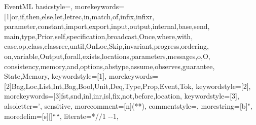 

\RequirePackage{listings}
\RequirePackage{color}


\lstdefinelanguage
    {EventML}
    {
      basicstyle=\sffamily,
      morekeywords=[1]{or,if,then,else,let,letrec,in,match,of,infix,infixr,%
        parameter,constant,import,export,input,output,internal,base,send,%
        main,type,Prior,self,specification,broadcast,Once,where,with,%
        case,op,class,classrec,until,OnLoc,Skip,invariant,progress,ordering,%
        on,variable,Output,forall,exists,locations,parameters,messages,o,O,%
        consistency,memory,and,options,abstype,assume,observes,guarantee,%
        State,Memory},
      keywordstyle=[1]\color{EMLpurple},
      morekeywords=[2]{Bag,Loc,List,Int,Bag,Bool,Unit,Deq,Type,Prop,Event,Tok},
      keywordstyle=[2]\color{EMLgreen},
      morekeywords=[3]{fst,snd,inl,inr,isl,fix,not,before,location},
      keywordstyle=[3]\color{EMLblue},
      alsoletter={'},
      sensitive,%
      morecomment=[n]{(*}{*)},
      commentstyle=\color{EMLred},
      morestring=[b]",
      moredelim=[s][\color{EMLpeach}]{``}{``},
      literate=*{/}{$/$}1 {-}{$\mbox{-}$}1, %
    }
